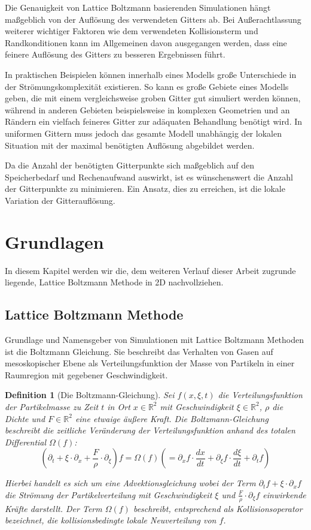 \documentclass[12pt,a4paper]{scrartcl}
\newtheorem{Definition}[Satz]{Definition}
\numberwithin{equation}{section}
\newcommand{\R}{\mathbb{R}} %
\begin{document}
Die Genauigkeit von Lattice Boltzmann basierenden Simulationen hängt maßgeblich von der Auflösung des verwendeten Gitters ab. Bei Außerachtlassung weiterer wichtiger Faktoren wie dem verwendeten Kollisionsterm und Randkonditionen kann im Allgemeinen davon ausgegangen werden, dass eine feinere Auflösung des Gitters zu besseren Ergebnissen führt.

In praktischen Beispielen können innerhalb eines Modells große Unterschiede in der Strömungskomplexität existieren. So kann es große Gebiete eines Modells geben, die mit einem vergleichsweise groben Gitter gut simuliert werden können, während in anderen Gebieten \textendash{} beispielsweise in komplexen Geometrien und an Rändern \textendash{} ein vielfach feineres Gitter zur adäquaten Behandlung benötigt wird. In uniformen Gittern muss jedoch das gesamte Modell unabhängig der lokalen Situation mit der maximal benötigten Auflösung abgebildet werden.

Da die Anzahl der benötigten Gitterpunkte sich maßgeblich auf den Speicherbedarf und Rechenaufwand auswirkt, ist es wünschenswert die Anzahl der Gitterpunkte zu minimieren. Ein Ansatz, dies zu erreichen, ist die lokale Variation der Gitterauflösung.

\newpage
\section{Grundlagen}

In diesem Kapitel werden wir die, dem weiteren Verlauf dieser Arbeit zugrunde liegende, Lattice Boltzmann Methode in 2D nachvollziehen.

\subsection{Lattice Boltzmann Methode}

Grundlage und Namensgeber von Simulationen mit Lattice Boltzmann Methoden ist die Boltzmann Gleichung. Sie beschreibt das Verhalten von Gasen auf mesoskopischer Ebene als Verteilungsfunktion der Masse von Partikeln in einer Raumregion mit gegebener Geschwindigkeit.

\begin{Definition}[Die Boltzmann-Gleichung]
Sei \(f(x,\xi,t)\) die Verteilungsfunktion der Partikelmasse zu Zeit \(t\) in Ort \(x \in \R^2\) mit Geschwindigkeit \(\xi \in \R^2\), \(\rho\) die Dichte und \(F \in \R^2\) eine etwaige äußere Kraft. Die Boltzmann-Gleichung beschreibt die zeitliche Veränderung der Verteilungsfunktion anhand des totalen Differential \(\Omega(f)\):
\[ \left( \partial_t + \xi \cdot \partial_x + \frac{F}{\rho} \cdot \partial_\xi \right) f = \Omega(f) \left( = \partial_x f \cdot \frac{dx}{dt} + \partial_\xi f \cdot \frac{d\xi}{dt} + \partial_t f \right) \]

Hierbei handelt es sich um eine Advektionsgleichung wobei der Term \(\partial_t f + \xi \cdot \partial_x f\) die Strömung der Partikelverteilung mit Geschwindigkeit \(\xi\) und \(\frac{F}{\rho} \cdot \partial_\xi f\) einwirkende Kräfte darstellt. Der Term \(\Omega(f)\) beschreibt, entsprechend als Kollisionsoperator bezeichnet, die kollisionsbedingte lokale Neuverteilung von \(f\).
\end{Definition}
\end{document}
